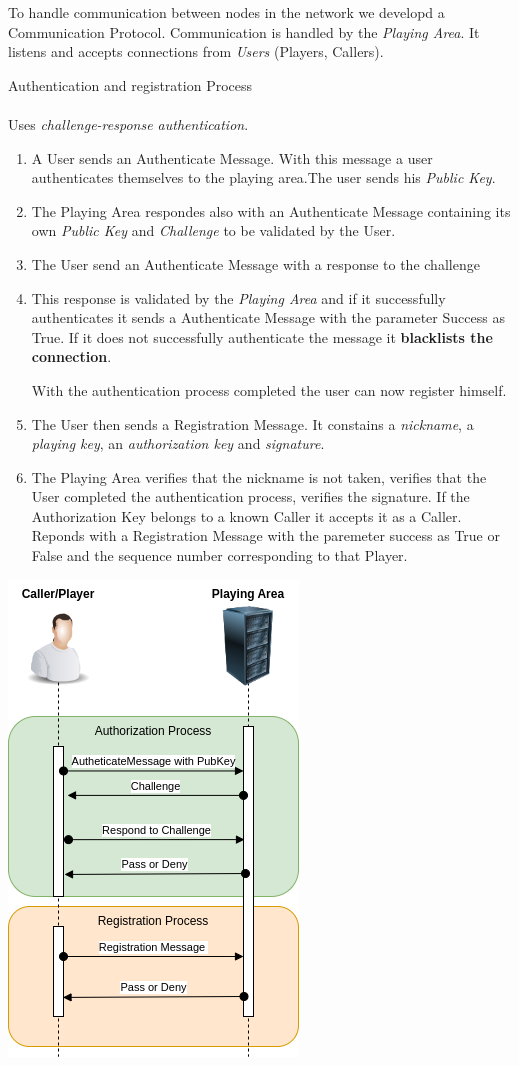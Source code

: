 \documentclass[11pt]{article}
\begin{document}
To handle communication between nodes in the network we developd a Communication Protocol. Communication is handled by the \emph{Playing Area}. It listens and accepts connections from \emph{Users} (Players, Callers).\\
\par {\Large Authentication and registration Process}
\\ \\
Uses \emph{challenge-response authentication}. 
\begin{enumerate}


  \item A User sends an Authenticate Message. With this message a user authenticates themselves to the playing area.The user sends his \emph{Public Key}.
  \item The Playing Area respondes also with an Authenticate Message containing its own \emph{Public Key} and \emph{Challenge} to be validated by the User.
  \item The User send an Authenticate Message with a response to the challenge
  \item This response is validated by the \emph{Playing Area} and if it successfully authenticates it sends a Authenticate Message with the parameter Success as True. If it does not successfully authenticate the message it \textbf{blacklists the connection}. \par With the authentication process completed the user can now register himself.
  \item The User then sends a Registration Message. It constains a \emph{nickname}, a \emph{playing key}, an  \emph{authorization key} and \emph{signature}.
  \item The 	Playing Area verifies that the nickname is not taken, verifies that the User completed the authentication process, verifies the signature. If the Authorization Key belongs to a known Caller it accepts it as a Caller. Reponds with a Registration Message with the paremeter success as True or False and the sequence number corresponding to that Player.

\end{enumerate}
\begin{center}
\includegraphics{AuthenticateUML.png}
\end{center}
\end{document}
